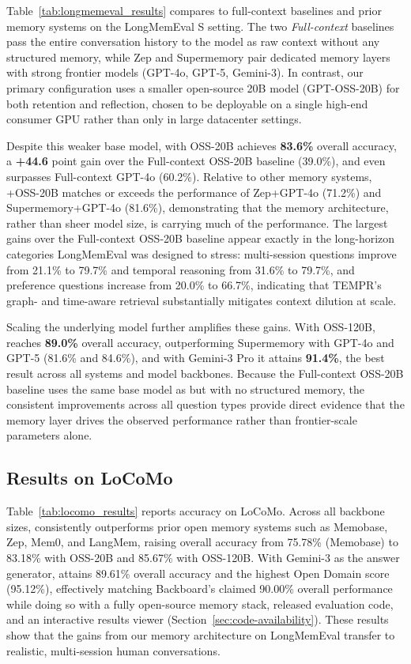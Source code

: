 Table~\ref{tab:longmemeval_results} compares \our to full-context baselines and prior memory systems on the LongMemEval S setting. The two \emph{Full-context} baselines pass the entire conversation history to the model as raw context without any structured memory, while Zep and Supermemory pair dedicated memory layers with strong frontier models (GPT-4o, GPT-5, Gemini-3). In contrast, our primary configuration uses a smaller open-source 20B model (GPT-OSS-20B) for both retention and reflection, chosen to be deployable on a single high-end consumer GPU rather than only in large datacenter settings. 

Despite this weaker base model, \our with OSS-20B achieves \textbf{83.6\%} overall accuracy, a \textbf{+44.6} point gain over the Full-context OSS-20B baseline (39.0\%), and even surpasses Full-context GPT-4o (60.2\%). Relative to other memory systems, \our+OSS-20B matches or exceeds the performance of Zep+GPT-4o (71.2\%) and Supermemory+GPT-4o (81.6\%), demonstrating that the memory architecture, rather than sheer model size, is carrying much of the performance. The largest gains over the Full-context OSS-20B baseline appear exactly in the long-horizon categories LongMemEval was designed to stress: multi-session questions improve from 21.1\% to 79.7\% and temporal reasoning from 31.6\% to 79.7\%, and preference questions increase from 20.0\% to 66.7\%, indicating that TEMPR’s graph- and time-aware retrieval substantially mitigates context dilution at scale.

Scaling the underlying model further amplifies these gains. With OSS-120B, \our reaches \textbf{89.0\%} overall accuracy, outperforming Supermemory with GPT-4o and GPT-5 (81.6\% and 84.6\%), and with Gemini-3 Pro it attains \textbf{91.4\%}, the best result across all systems and model backbones. Because the Full-context OSS-20B baseline uses the same base model as \our but with no structured memory, the consistent improvements across all question types provide direct evidence that the memory layer drives the observed performance rather than frontier-scale parameters alone.



\subsection{Results on LoCoMo}

Table~\ref{tab:locomo_results} reports accuracy on LoCoMo. Across all backbone sizes, \our
consistently outperforms prior open memory systems such as Memobase, Zep, Mem0, and LangMem, raising overall accuracy from 75.78\% (Memobase) to 83.18\% with OSS-20B and 85.67\% with OSS-120B. With Gemini-3 as the answer generator, \our attains 89.61\% overall accuracy and the highest Open Domain score (95.12\%), effectively matching Backboard’s claimed 90.00\% overall performance while doing so with a fully open-source memory stack, released evaluation code, and an interactive results viewer (Section~\ref{sec:code-availability}). These results show that the gains from our memory architecture on LongMemEval transfer to realistic, multi-session human conversations.

